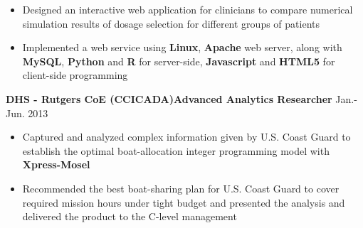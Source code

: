 \documentclass[10.5pt]{res} %
\begin{document}
\begin{resume}
\begin{itemize}
			\item %
			Designed an interactive web application for clinicians to compare numerical simulation results of dosage selection for different groups of patients
			\item Implemented a web service using \textbf{Linux}, \textbf{Apache} web server, along with \textbf{MySQL}, \textbf{Python} and \textbf{R} for server-side, \textbf{Javascript} and \textbf{HTML5} for client-side programming %
		\end{itemize}\vspace{-\topsep}
    \textbf{%
    DHS - Rutgers CoE (CCICADA)}\quad\quad\textbf{Advanced Analytics Researcher}  \hfill Jan.-Jun. 2013
        \begin{itemize} pt
            \item Captured and analyzed complex information given by U.S. Coast Guard to establish the optimal boat-allocation integer programming model with \textbf{Xpress-Mosel}%
            \item Recommended the best boat-sharing plan for U.S. Coast Guard to cover required mission hours under tight budget and presented the analysis and delivered the product to the C-level management %
        \end{itemize}\vspace{-\topsep}

\end{resume}
\end{document}
